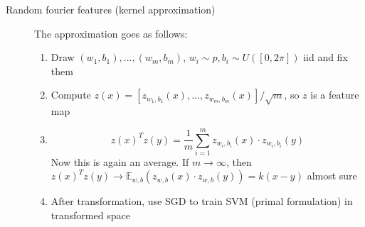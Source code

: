 \documentclass[11pt,landscape]{article}
\begin{document}
\begin{multicols}{3}
\begin{description}
    \item[Random fourier features (kernel approximation)] The approximation goes as follows:
    \begin{enumerate}
	    \item Draw $(w_1,b_1),...,(w_m,b_m)$, $w_i \sim p, b_i \sim U([0, 2\pi])$ iid and fix them 
	    \item Compute $z(x) = [z_{w_1,b_1}(x),...,z_{w_m,b_m}(x)]/\sqrt{m}$, so $z$ is a feature map
	    \item $$z(x)^T z(y) = \frac{1}{m} \sum_{i=1}^{m} z_{w_i,b_i} (x) \cdot     z_{w_i,b_i} (y)$$
	    Now this is again an average. If $m \rightarrow \infty$, then $z(x)^T z(y)     \rightarrow  \mathbb{E}_{w,b} ( z_{w,b}(x) \cdot z_{w,b} (y) ) = k(x-y)$     almost sure
	    \item After transformation, use SGD to train SVM (primal formulation) in transformed space
    \end{enumerate} 
\end{description}



\end{multicols}

\end{document}
